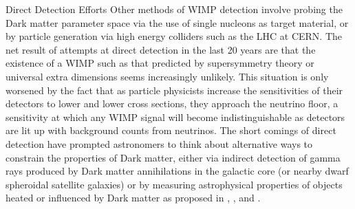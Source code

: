\documentclass[a4paper,11pt]{article}
\begin{document}
\begin{section}{Direct Detection Efforts}
    Other methods of WIMP detection involve probing the Dark matter parameter space via the use of single nucleons as target material, or by particle generation via high energy colliders such as the LHC at CERN.
    The net result of attempts at direct detection in the last 20 years are that the existence of a WIMP such as that predicted by supersymmetry theory or universal extra dimensions seems increasingly unlikely.
    This situation is only worsened by the fact that as particle physicists increase the sensitivities of their detectors to lower and lower cross sections, they approach the neutrino floor, a sensitivity at which any WIMP signal will become indistinguishable as detectors are lit up with background counts from neutrinos.
    The short comings of direct detection have prompted astronomers to think about alternative ways to constrain the properties of Dark matter, either via indirect detection of gamma rays produced by Dark matter annihilations in the galactic core (or nearby dwarf spheroidal satellite galaxies) or by measuring astrophysical properties of objects heated or influenced by Dark matter as proposed in  \cite{Ilie:2020popiii}, \cite{Leane:2021}, \cite{Ilie:2019} and \cite{Ilie:2020floor}.
\end{section}
\end{document}

